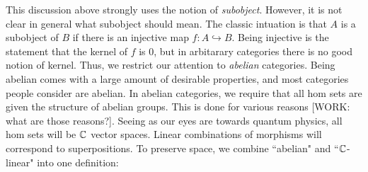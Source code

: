 \documentclass{article}
\theoremstyle{definition}
\numberwithin{figure}{section}
\begin{document}
This discussion above strongly uses the notion of \textit{subobject}. However, it is not clear in general what subobject should mean. The classic intuation is that $A$ is a subobject of $B$ if there is an injective map $f:A\hookrightarrow{}B$. Being injective is the statement that the kernel of $f$ is  $0$, but in arbitarary categories there is no good notion of kernel. Thus, we restrict our attention to \textit{abelian} categories. Being abelian comes with a large amount of desirable properties, and most categories people consider are abelian. In abelian categories, we require that all hom sets are given the structure of abelian groups. This is done for various reasons [WORK: what are those reasons?]. Seeing as our eyes are towards quantum physics, all hom sets will be $\mathbb{C}$ vector spaces. Linear combinations of morphisms will correspond to superpositions. To preserve space, we combine ``abelian" and ``$\mathbb{C}$-linear" into one definition:
\end{document}
